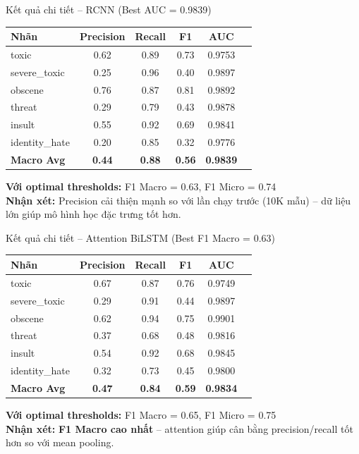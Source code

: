 \documentclass[serif, aspectratio=169]{beamer}
\newcommand{\red}[1]{\textbf{\color{hkustred}#1}}
\begin{document}
\begin{frame}{Kết quả chi tiết -- RCNN (Best AUC = 0.9839)}
\begin{table}
\centering
\small
\begin{tabular}{lccccc}
\toprule
\textbf{Nhãn} & \textbf{Precision} & \textbf{Recall} & \textbf{F1} & \textbf{AUC} \\
\midrule
toxic & 0.62 & 0.89 & 0.73 & 0.9753 \\
severe\_toxic & 0.25 & 0.96 & 0.40 & 0.9897 \\
obscene & 0.76 & 0.87 & 0.81 & 0.9892 \\
threat & 0.29 & 0.79 & 0.43 & 0.9878 \\
insult & 0.55 & 0.92 & 0.69 & 0.9841 \\
identity\_hate & 0.20 & 0.85 & 0.32 & 0.9776 \\
\midrule
\textbf{Macro Avg} & \textbf{0.44} & \textbf{0.88} & \textbf{0.56} & \textbf{0.9839} \\
\bottomrule
\end{tabular}
\end{table}
\vspace{0.2cm}
\textbf{Với optimal thresholds:} F1 Macro = 0.63, F1 Micro = 0.74 \\
\textbf{Nhận xét:} Precision cải thiện mạnh so với lần chạy trước (10K mẫu) -- dữ liệu lớn giúp mô hình học đặc trưng tốt hơn.
\end{frame}

\begin{frame}{Kết quả chi tiết -- Attention BiLSTM (Best F1 Macro = 0.63)}
\begin{table}
\centering
\small
\begin{tabular}{lccccc}
\toprule
\textbf{Nhãn} & \textbf{Precision} & \textbf{Recall} & \textbf{F1} & \textbf{AUC} \\
\midrule
toxic & 0.67 & 0.87 & 0.76 & 0.9749 \\
severe\_toxic & 0.29 & 0.91 & 0.44 & 0.9897 \\
obscene & 0.62 & 0.94 & 0.75 & 0.9901 \\
threat & 0.37 & 0.68 & 0.48 & 0.9816 \\
insult & 0.54 & 0.92 & 0.68 & 0.9845 \\
identity\_hate & 0.32 & 0.73 & 0.45 & 0.9800 \\
\midrule
\textbf{Macro Avg} & \textbf{0.47} & \textbf{0.84} & \textbf{0.59} & \textbf{0.9834} \\
\bottomrule
\end{tabular}
\end{table}
\vspace{0.2cm}
\textbf{Với optimal thresholds:} F1 Macro = 0.65, F1 Micro = 0.75 \\
\textbf{Nhận xét:} \red{F1 Macro cao nhất} -- attention giúp cân bằng precision/recall tốt hơn so với mean pooling.
\end{frame}
\end{document}
